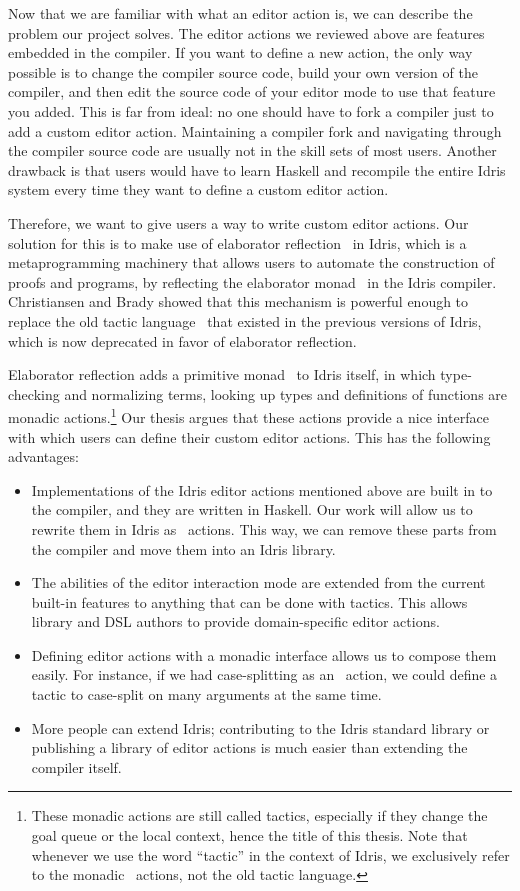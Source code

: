 Now that we are familiar with what an editor action is, we can describe the problem
our project solves. The editor actions we reviewed above are features embedded
in the compiler. If you want to define a new action, the only way possible is
to change the compiler source code, build your own version of the compiler,
and then edit the source code of your editor mode to use that feature you
added. This is far from ideal: no one should have to fork a compiler
just to add a custom editor action. Maintaining a compiler fork and
navigating through the compiler source code are usually not in the skill sets
of most users.
Another drawback is that users would have to learn Haskell and recompile the
entire Idris system every time they want to define a custom editor action.

Therefore, we want to give users a way to write custom editor actions. Our
solution for this is to make use of elaborator reflection~\cite{elabref} in
Idris, which is a metaprogramming machinery that allows users to automate the
construction of proofs and programs, by reflecting the elaborator
monad~\cite{idris} in the Idris compiler. Christiansen and Brady showed that
this mechanism is powerful enough to replace the old tactic
language~\cite{elabref} that existed in the previous versions of Idris, which is
now deprecated in favor of elaborator reflection.

Elaborator reflection adds a primitive monad \Elab\ to Idris itself, in which
type-checking and normalizing terms, looking up types and definitions of
functions are monadic actions.\footnote{These monadic actions are still called
tactics, especially if they change the goal queue or the local context, hence the
title of this thesis. Note that whenever we use the word ``tactic'' in the
context of Idris, we exclusively refer to the monadic \Elab\ actions, not the
old tactic language.}
Our thesis argues that these actions provide a nice interface with which users
can define their custom editor actions. This has the following advantages:

\begin{itemize}
\item Implementations of the Idris editor actions mentioned above are
built in to the compiler, and they are written in Haskell. Our work will allow
us to rewrite them in Idris as \Elab\ actions. This way, we can remove these
parts from the compiler and move them into an Idris library.
\item The abilities of the editor interaction mode are extended from the
current built-in features to anything that can be done with tactics. This
allows library and DSL authors to provide domain-specific editor actions.
\item Defining editor actions with a monadic interface allows us to
compose them easily. For instance, if we had case-splitting as an
\Elab\ action, we could define a tactic to case-split on many arguments at the
same time.
\item More people can extend Idris; contributing to the Idris standard library
  or publishing a library of editor actions is much easier than extending the
    compiler itself.
\end{itemize}

